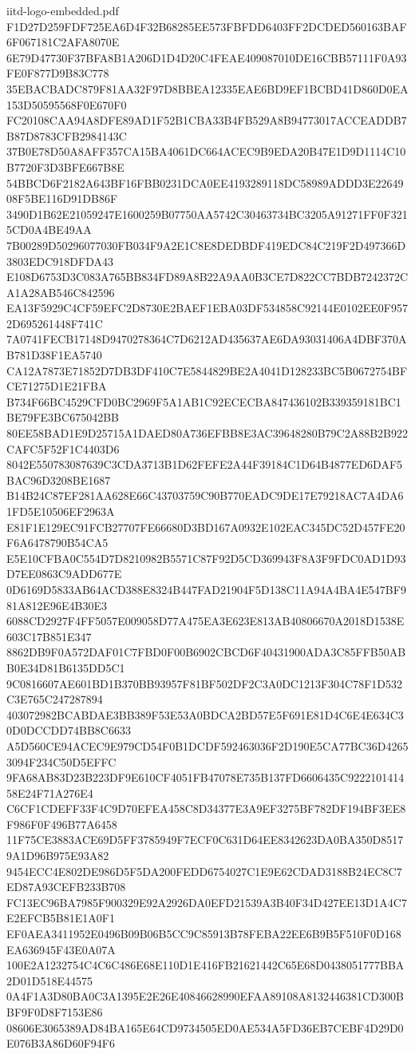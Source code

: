 \begin{filecontents*}[overwrite]{iitd-logo-embedded.pdf}
F1D27D259FDF725EA6D4F32B68285EE573FBFDD6403FF2DCDED560163BAF6F067181C2AFA8070E
6E79D47730F37BFA8B1A206D1D4D20C4FEAE409087010DE16CBB57111F0A93FE0F877D9B83C778
35EBACBADC879F81AA32F97D8BBEA12335EAE6BD9EF1BCBD41D860D0EA153D50595568F0E670F0
FC20108CAA94A8DFE89AD1F52B1CBA33B4FB529A8B94773017ACCEADDB7B87D8783CFB2984143C
37B0E78D50A8AFF357CA15BA4061DC664ACEC9B9EDA20B47E1D9D1114C10B7720F3D3BFE667B8E
54BBCD6F2182A643BF16FBB0231DCA0EE4193289118DC58989ADDD3E2264908F5BE116D91DB86F
3490D1B62E21059247E1600259B07750AA5742C30463734BC3205A91271FF0F3215CD0A4BE49AA
7B00289D50296077030FB034F9A2E1C8E8DEDBDF419EDC84C219F2D497366D3803EDC918DFDA43
E108D6753D3C083A765BB834FD89A8B22A9AA0B3CE7D822CC7BDB7242372CA1A28AB546C842596
EA13F5929C4CF59EFC2D8730E2BAEF1EBA03DF534858C92144E0102EE0F9572D695261448F741C
7A0741FECB17148D9470278364C7D6212AD435637AE6DA93031406A4DBF370AB781D38F1EA5740
CA12A7873E71852D7DB3DF410C7E5844829BE2A4041D128233BC5B0672754BFCE71275D1E21FBA
B734F66BC4529CFD0BC2969F5A1AB1C92ECECBA847436102B339359181BC1BE79FE3BC675042BB
80EE58BAD1E9D25715A1DAED80A736EFBB8E3AC39648280B79C2A88B2B922CAFC5F52F1C4403D6
8042E550783087639C3CDA3713B1D62FEFE2A44F39184C1D64B4877ED6DAF5BAC96D3208BE1687
B14B24C87EF281AA628E66C43703759C90B770EADC9DE17E79218AC7A4DA61FD5E10506EF2963A
E81F1E129EC91FCB27707FE66680D3BD167A0932E102EAC345DC52D457FE20F6A6478790B54CA5
E5E10CFBA0C554D7D8210982B5571C87F92D5CD369943F8A3F9FDC0AD1D93D7EE0863C9ADD677E
0D6169D5833AB64ACD388E8324B447FAD21904F5D138C11A94A4BA4E547BF981A812E96E4B30E3
6088CD2927F4FF5057E009058D77A475EA3E623E813AB40806670A2018D1538E603C17B851E347
8862DB9F0A572DAF01C7FBD0F00B6902CBCD6F40431900ADA3C85FFB50ABB0E34D81B6135DD5C1
9C0816607AE601BD1B370BB93957F81BF502DF2C3A0DC1213F304C78F1D532C3E765C247287894
403072982BCABDAE3BB389F53E53A0BDCA2BD57E5F691E81D4C6E4E634C30D0DCCDD74BB8C6633
A5D560CE94ACEC9E979CD54F0B1DCDF592463036F2D190E5CA77BC36D42653094F234C50D5EFFC
9FA68AB83D23B223DF9E610CF4051FB47078E735B137FD6606435C922210141458E24F71A276E4
C6CF1CDEFF33F4C9D70EFEA458C8D34377E3A9EF3275BF782DF194BF3EE8F986F0F496B77A6458
11F75CE3883ACE69D5FF3785949F7ECF0C631D64EE8342623DA0BA350D85179A1D96B975E93A82
9454ECC4E802DE986D5F5DA200FEDD6754027C1E9E62CDAD3188B24EC8C7ED87A93CEFB233B708
FC13EC96BA7985F900329E92A2926DA0EFD21539A3B40F34D427EE13D1A4C7E2EFCB5B81E1A0F1
EF0AEA3411952E0496B09B06B5CC9C85913B78FEBA22EE6B9B5F510F0D168EA636945F43E0A07A
100E2A1232754C4C6C486E68E110D1E416FB21621442C65E68D0438051777BBA2D01D518E44575
0A4F1A3D80BA0C3A1395E2E26E40846628990EFAA89108A8132446381CD300BBF9F0D8F7153E86
08606E3065389AD84BA165E64CD9734505ED0AE534A5FD36EB7CEBF4D29D0E076B3A86D60F94F6

\end{filecontents*}
